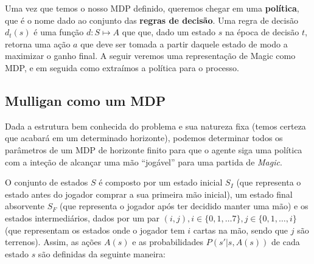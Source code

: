 \documentclass{book}
\begin{document}
Uma vez que temos o nosso MDP definido, queremos chegar em uma \textbf{política}, que é o nome dado
ao conjunto das \textbf{regras de decisão}. Uma regra de decisão $d_t(s)$ é uma função $d: S \mapsto A$
que que, dado um estado $s$ na época de decisão $t$, retorna uma ação $a$ que deve ser tomada a partir
daquele estado de modo a maximizar o ganho final. A seguir veremos uma representação de Magic como MDP,
e em seguida como extraímos a política para o processo.

\subsection{Mulligan como um MDP}

Dada a estrutura bem conhecida do problema e sua natureza fixa (temos certeza que acabará em um determinado horizonte), podemos determinar todos os parâmetros de um MDP de horizonte finito para que o agente siga uma política com a inteção de alcançar uma mão ``jogável'' para uma partida de \textit{Magic}.

O conjunto de estados $S$ é composto por um estado inicial $S_I$ (que representa o estado antes do jogador comprar a sua primeira mão inicial),
um estado final absorvente $S_F$ (que representa o jogador após ter decidido manter uma mão) e os estados intermediários, dados por um par
$(i, j), i \in \{ 0, 1, \ldots 7\}, j \in \{ 0, 1, \ldots, i \}$ (que representam os estados onde o jogador tem $i$ cartas na mão, sendo que $j$ são terrenos). Assim, as ações $A(s)$ e as probabilidades $P(s'|s, A(s))$ de cada estado $s$ são definidas da seguinte maneira:
\end{document}

